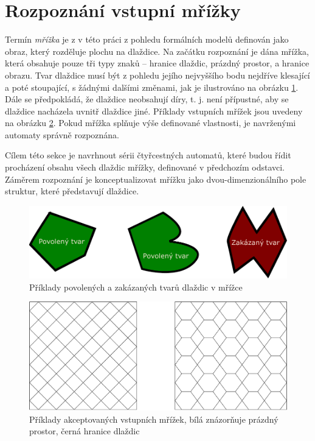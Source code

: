 \section{Rozpoznání vstupní mřížky}
\label{section:recogTheory}
Termín \emph{mřížka} je z v této práci z pohledu formálních modelů definován jako obraz, který rozděluje plochu na dlaždice.
Na začátku rozpoznání je dána mřížka, která obsahuje pouze tři typy znaků -- hranice dlaždic, prázdný prostor, a hranice obrazu.
Tvar dlaždice musí být z pohledu jejího nejvyššího bodu nejdříve klesající a poté stoupající, s žádnými dalšími změnami, jak je ilustrováno na obrázku \ref{fig:TvaryDlazdic}. Dále se předpokládá, že dlaždice neobsahují díry, t. j. není přípustné, aby se dlaždice nacházela uvnitř dlaždice jiné. Příklady vstupních mřížek jsou uvedeny na obrázku \ref{fig:MrizkaPriklad}. Pokud mřížka splňuje výše definované vlastnosti, je navrženými automaty správně rozpoznána.

Cílem této sekce je navrhnout sérii čtyřcestných automatů, které budou řídit procházení obsahu všech dlaždic mřížky, definované v předchozím odstavci. Záměrem rozpoznání je konceptualizovat mřížku jako dvou-dimenzionálního pole struktur, které představují dlaždice.
\begin{figure}[H]
    \centering
    \includegraphics[width=\textwidth]{obrazky-figures/tvaryDlazdic.pdf}
    \caption{Příklady povolených a zakázaných tvarů dlaždic v mřížce}
    \label{fig:TvaryDlazdic}
\end{figure}

\begin{figure}[H]
    \centering
    \includegraphics[width=\textwidth]{obrazky-figures/MrizkaPriklad.pdf}
    \caption{Příklady akceptovaných vstupních mřížek, bílá znázorňuje prázdný prostor, černá hranice dlaždic}
    \label{fig:MrizkaPriklad}
\end{figure}

